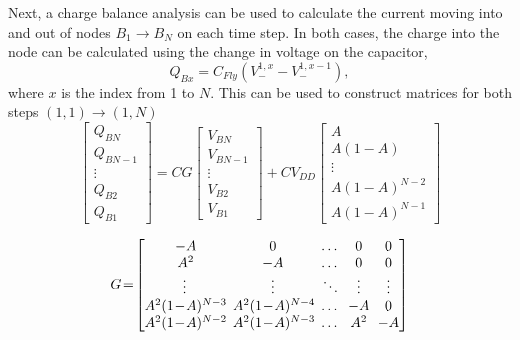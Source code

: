 \documentclass[conference]{IEEEtran}
\begin{document}
	Next, a charge balance analysis can be used to calculate the current moving into and out of nodes $B_1 \rightarrow B_N$ on each time step. In both cases, the charge into the node can be calculated using the change in voltage on the capacitor,
	\begin{equation}
	Q_{Bx} = C_{Fly}(V_-^{1,x} - V_-^{1,x-1}),
	\end{equation}
	where $x$ is the index from 1 to $N$. This can be used to construct matrices for both steps $(1,1)\rightarrow(1,N)$
	\begin{equation}
	\begin{bmatrix}
	Q_{BN} \\
	Q_{BN-1} \\
	\vdots\\
	Q_{B2} \\ 
	Q_{B1}
	\end{bmatrix}\!
	= \!
	CG\!\begin{bmatrix}
	V_{BN} \\
	V_{BN-1} \\
	\vdots \\
	V_{B2} \\
	V_{B1}
	\end{bmatrix}\!+ CV_{DD}\!\begin{bmatrix}
	A \\
	A(1-A) \\
	\vdots \\
	A(1\!-\!A)^{N-2} \\
	A(1\!-\!A)^{N-1}
	\end{bmatrix}
	\label{eq:Q_V1}
	\end{equation}	
	
	\begin{equation}
	G\!=\!	
	\arraycolsep3pt 
	\begin{bmatrix}
	-A \!& 0 & \dots & 0 & 0 \\
	A^2 \!& -A & \dots & 0 & 0\\
	\vdots & \vdots & \ddots & \vdots & \vdots \\
	A^2(1\!-\!A)^{N-3} \!& A^2(1\!-\!A)^{N-4} \!& \dots & -A & 0\\ 
	A^2(1\!-\!A)^{N-2} \!& A^2(1\!-\!A)^{N-3} \!& \dots & A^2 & -A 
	\end{bmatrix}
	\vspace{1pt}
	\end{equation}
	
\end{document}
